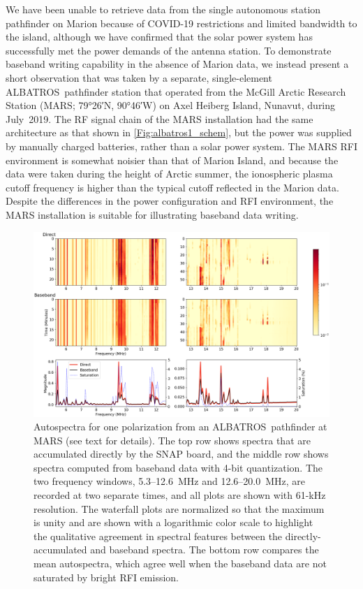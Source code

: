 \documentclass{ws-jai}
\def\albatros{ALBATROS}
\begin{document}
We have been unable to retrieve data from the single autonomous
station pathfinder on Marion because of COVID-19 restrictions and
limited bandwidth to the island, although we have confirmed that the
solar power system has successfully met the power demands of the
antenna station.  To demonstrate baseband writing capability in the
absence of Marion data, we instead present a short observation that
was taken by a separate, single-element \albatros\ pathfinder station
that operated from the McGill Arctic Research Station (MARS;
\ang{79;26;}N, \ang{90;46;}W) on Axel Heiberg Island, Nunavut, during
July~2019.  The RF signal chain of the MARS installation had the same
architecture as that shown in \autoref{Fig:albatros1_schem}, but the
power was supplied by manually charged batteries, rather than a solar
power system.  The MARS RFI environment is somewhat noisier than that
of Marion Island, and because the data were taken during the height of
Arctic summer, the ionospheric plasma cutoff frequency is higher than
the typical cutoff reflected in the Marion data.  Despite the
differences in the power configuration and RFI environment, the MARS
installation is suitable for illustrating baseband data writing.

\begin{figure}[t]
  \begin{center}
    \includegraphics[width=\linewidth]{Figures/baseband_direct_auto_compare.png}
    \caption{Autospectra for one polarization from an
      \albatros\ pathfinder at MARS (see text for details).  The top
      row shows spectra that are accumulated directly by the SNAP
      board, and the middle row shows spectra computed from baseband
      data with 4-bit quantization.  The two frequency windows,
      5.3--12.6~MHz and 12.6--20.0~MHz, are recorded at two separate
      times, and all plots are shown with 61-kHz resolution.  The
      waterfall plots are normalized so that the maximum is unity and
      are shown with a logarithmic color scale to highlight the
      qualitative agreement in spectral features between the
      directly-accumulated and baseband spectra.  The bottom row
      compares the mean autospectra, which agree well when the
      baseband data are not saturated by bright RFI emission.}
    \label{Fig:baseband_direct_auto}
  \end{center}
\end{figure}
\end{document}
